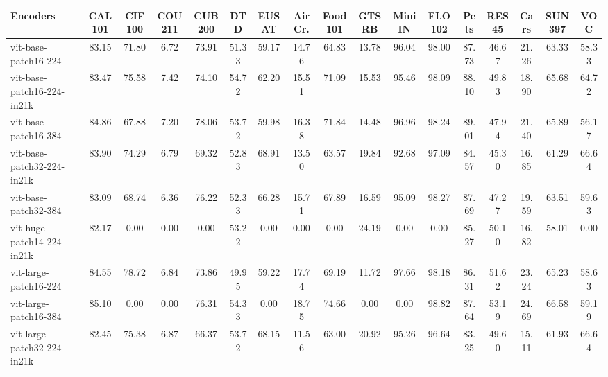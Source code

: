 \begin{tabular}{l cccccccccccccccc}
\toprule
Encoders & CAL101 & CIF100 & COU211 & CUB200 & DTD & EUSAT & AirCr. & Food101 & GTSRB & MiniIN & FLO102 & Pets & RES45 & Cars & SUN397 & VOC \\ \hline
vit-base-patch16-224 & 83.15 & 71.80 & 6.72 & 73.91 & 51.33 & 59.17 & 14.76 & 64.83 & 13.78 & 96.04 & 98.00 & 87.73 & 46.67 & 21.26 & 63.33 & 58.33\\
vit-base-patch16-224-in21k & 83.47 & 75.58 & 7.42 & 74.10 & 54.72 & 62.20 & 15.51 & 71.09 & 15.53 & 95.46 & 98.09 & 88.10 & 49.83 & 18.90 & 65.68 & 64.72\\
vit-base-patch16-384 & 84.86 & 67.88 & 7.20 & 78.06 & 53.72 & 59.98 & 16.38 & 71.84 & 14.48 & 96.96 & 98.24 & 89.01 & 47.94 & 21.40 & 65.89 & 56.17\\
vit-base-patch32-224-in21k & 83.90 & 74.29 & 6.79 & 69.32 & 52.83 & 68.91 & 13.50 & 63.57 & 19.84 & 92.68 & 97.09 & 84.57 & 45.30 & 16.85 & 61.29 & 66.64\\
vit-base-patch32-384 & 83.09 & 68.74 & 6.36 & 76.22 & 52.33 & 66.28 & 15.71 & 67.89 & 16.59 & 95.09 & 98.27 & 87.69 & 47.27 & 19.59 & 63.51 & 59.63\\
vit-huge-patch14-224-in21k & 82.17 & 0.00 & 0.00 & 0.00 & 53.22 & 0.00 & 0.00 & 0.00 & 24.19 & 0.00 & 0.00 & 85.27 & 50.10 & 16.82 & 58.01 & 0.00\\
vit-large-patch16-224 & 84.55 & 78.72 & 6.84 & 73.86 & 49.95 & 59.22 & 17.74 & 69.19 & 11.72 & 97.66 & 98.18 & 86.31 & 51.62 & 23.24 & 65.23 & 58.63\\
vit-large-patch16-384 & 85.10 & 0.00 & 0.00 & 76.31 & 54.33 & 0.00 & 18.75 & 74.66 & 0.00 & 0.00 & 98.82 & 87.64 & 53.19 & 24.69 & 66.58 & 59.19\\
vit-large-patch32-224-in21k & 82.45 & 75.38 & 6.87 & 66.37 & 53.72 & 68.15 & 11.56 & 63.00 & 20.92 & 95.26 & 96.64 & 83.25 & 49.60 & 15.11 & 61.93 & 66.64\\
\bottomrule
\end{tabular}
